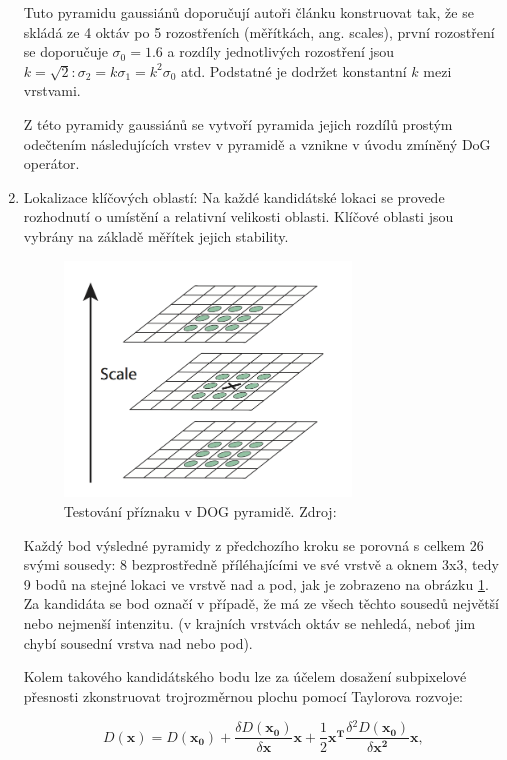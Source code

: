 \begin{enumerate}
			Tuto pyramidu gaussiánů doporučují autoři článku \cite{lowe2004distinctive} konstruovat tak, že se skládá ze 4 oktáv po 5 rozostřeních (měřítkách, ang. scales), první rozostření se doporučuje $\sigma_0 = 1.6$ a rozdíly jednotlivých rozostření jsou $k=\sqrt{2}: \sigma_2 = k \sigma_1 = k^2 \sigma_0$ atd. Podstatné je dodržet konstantní $k$ mezi vrstvami.
			
			Z této pyramidy gaussiánů se vytvoří pyramida jejich rozdílů prostým odečtením následujících vrstev v pyramidě a vznikne v úvodu zmíněný DoG operátor.		
			
		\item Lokalizace klíčových oblastí: Na každé kandidátské lokaci se provede rozhodnutí o umístění a relativní velikosti oblasti. Klíčové oblasti jsou vybrány na základě měřítek jejich stability.
		
    		\begin{figure}[!ht] 
    			\centering
    				\includegraphics[width=3in]{img/sift_feature.png}
    			\caption{Testování příznaku v DOG pyramidě. Zdroj: \cite{lowe2004distinctive}} 	\label{sift_feature}
    		\end{figure} 
		
			Každý bod výsledné pyramidy z předchozího kroku se porovná s celkem 26 svými sousedy: 8 bezprostředně příléhajícími ve své vrstvě a oknem 3x3, tedy 9 bodů na stejné lokaci ve vrstvě nad a pod, jak je zobrazeno na obrázku \ref{sift_feature}. Za kandidáta se bod označí v případě, že má ze všech těchto sousedů největší nebo nejmenší intenzitu. (v krajních vrstvách oktáv se nehledá, neboť jim chybí sousední vrstva nad nebo pod).
			
			Kolem takového kandidátského bodu lze za účelem dosažení subpixelové přesnosti zkonstruovat trojrozměrnou plochu pomocí Taylorova rozvoje:
			
			\begin{equation}
			\label{rozvoj}
			D(\mathbf{x}) = D(\mathbf{x_0}) + \frac{\delta D(\mathbf{x_0})}{\delta \mathbf{x}} \mathbf{x} + \frac{1}{2} \mathbf{x^T}\frac{\delta{}^2 D(\mathbf{x_0})}{\delta{}\mathbf{x^2}}\mathbf{x}, 
			\end{equation}
			

\end{enumerate}
